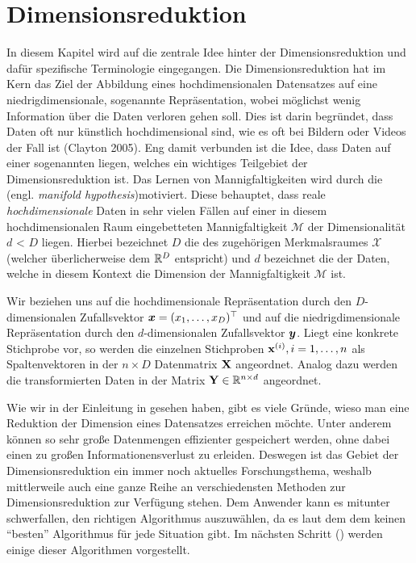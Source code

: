 \chapter{Dimensionsreduktion}
\label{ch:Dimensionsreduktion}

In diesem Kapitel wird auf die zentrale Idee hinter der Dimensionsreduktion und dafür spezifische Terminologie eingegangen.
Die Dimensionsreduktion hat im Kern das Ziel der Abbildung eines hochdimensionalen Datensatzes auf eine niedrigdimensionale, sogenannte  Repräsentation, wobei möglichst wenig Information über die Daten verloren gehen soll. Dies ist darin begründet, dass Daten oft nur künstlich hochdimensional sind, wie es oft bei Bildern oder Videos der Fall ist \addref (Clayton 2005). Eng damit verbunden ist die Idee, dass Daten auf einer sogenannten  liegen, welches ein wichtiges Teilgebiet der Dimensionsreduktion ist. Das Lernen von Mannigfaltigkeiten wird durch die  (engl. \textit{manifold hypothesis})\addref motiviert. Diese behauptet, dass
reale \textit{hochdimensionale} Daten in sehr vielen Fällen auf einer in diesem hochdimensionalen Raum eingebetteten Mannigfaltigkeit $\mathcal{M}$ der Dimensionalität $d$ < $D$ liegen.\addref
{}
Hierbei bezeichnet $D$ die  des zugehörigen Merkmalsraumes $\mathcal{X}$ (welcher überlicherweise dem $\mathbb{R}^D$ entspricht) und $d$ bezeichnet die  der Daten, welche in diesem Kontext die Dimension der Mannigfaltigkeit $\mathcal{M}$ ist.

Wir beziehen uns auf die hochdimensionale Repräsentation durch den $D$-dimensionalen Zufallsvektor $\bm{x} = (x_1, \ldots, x_D)^\top$ und auf die niedrigdimensionale Repräsentation durch den $d$-dimensionalen Zufallsvektor $\bm{y}$.
Liegt eine konkrete Stichprobe vor, so werden die einzelnen Stichproben $\mathbf{x}^{(i)}, i = 1,\ldots,n$ als Spaltenvektoren in der $n \times D$ Datenmatrix $\mathbf{X}$ angeordnet. Analog dazu werden die transformierten Daten in der Matrix $\mathbf{Y} \in \mathbb{R}^{n \times d}$ angeordnet.

Wie wir in der Einleitung in  gesehen haben, gibt es viele Gründe, wieso man eine Reduktion der Dimension eines Datensatzes erreichen möchte. Unter anderem können so sehr große Datenmengen effizienter gespeichert werden, ohne dabei einen zu großen Informationensverlust zu erleiden. Deswegen ist das Gebiet der Dimensionsreduktion ein immer noch aktuelles Forschungsthema, weshalb mittlerweile auch eine ganze Reihe an verschiedensten Methoden zur Dimensionsreduktion zur Verfügung stehen. Dem Anwender kann es mitunter schwerfallen, den richtigen Algorithmus auszuwählen, da es laut dem dem \addref keinen \enquote{besten} Algorithmus für jede Situation gibt. Im nächsten Schritt () werden einige dieser Algorithmen vorgestellt.

